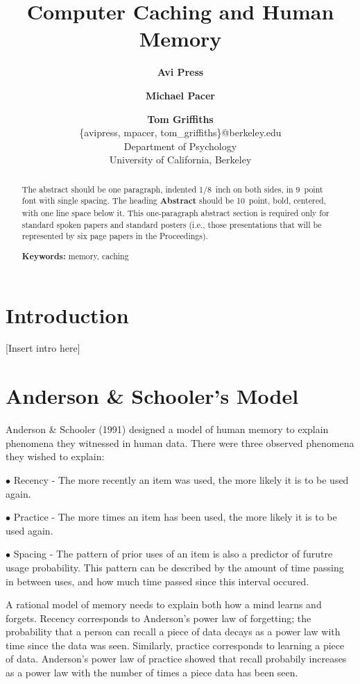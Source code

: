 \documentclass[10pt,letterpaper]{article}
\title{Computer Caching and Human Memory}
\author{{\large \bf Avi Press} \and {\large \bf Michael Pacer} \and {\large \bf Tom Griffiths} \\
  \{avipress, mpacer, tom\_griffiths\}@berkeley.edu \\
  Department of Psychology \\ University of California, Berkeley}
\begin{document}
\maketitle

\begin{abstract}

The abstract should be one paragraph, indented 1/8~inch on both sides,
in 9~point font with single spacing. The heading {\bf Abstract} should
be 10~point, bold, centered, with one line space below it. This
one-paragraph abstract section is required only for standard spoken
papers and standard posters (i.e., those presentations that will be
represented by six page papers in the Proceedings).

\textbf{Keywords:} 
memory, caching
\end{abstract}

\section{Introduction}

[Insert intro here]

\section{Anderson \& Schooler's Model}

Anderson \& Schooler (1991) designed a model of human memory to explain phenomena
they witnessed in human data. There were three observed phenomena they wished to explain:

$\bullet$ Recency - The more recently an item was used, the more likely it is to be used again.

$\bullet$ Practice - The more times an item has been used, the more likely it is to be used again.

$\bullet$ Spacing - The pattern of prior uses of an item is also a predictor of furutre usage
probability. This pattern can be described by the amount of time passing in between
uses, and how much time passed since this interval occured. 

A rational model of memory needs to explain both how a mind learns and forgets.
Recency corresponds to Anderson's power law of forgetting; the probability that
a person can recall a piece of data decays as a power law with time since the data was seen. Similarly, practice
corresponds to learning a piece of data. Anderson's power law of practice showed that recall probabily increases 
as a power law with the number of times a piece data has been seen.
\end{document}
